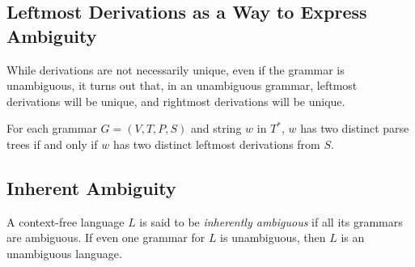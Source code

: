 \documentclass[]{article}
\begin{document}
  \subsection*{Leftmost Derivations as a Way to Express Ambiguity}
    While derivations are not necessarily unique, even if the grammar is
    unambiguous, it turns out that, in an unambiguous grammar, leftmost
    derivations will be unique, and rightmost derivations will be unique.
      \begin{thm}
        For each grammar $G = (V,T,P,S)$ and string $w$ in $T^*$, $w$ has two
        distinct parse trees if and only if $w$ has two distinct leftmost
        derivations from $S$.
      \end{thm}

  \subsection*{Inherent Ambiguity}
    A context-free language $L$ is said to be \emph{inherently ambiguous} if all
    its grammars are ambiguous. If even one grammar for $L$ is unambiguous, then
    $L$ is an unambiguous language.
\end{document}

